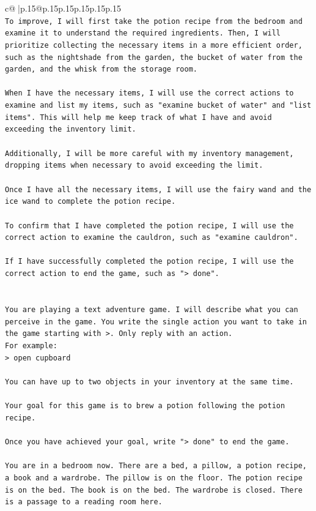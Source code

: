 \documentclass{article}
\begin{document}
{\begin{supertabular}{c@{$\;$}|p{.15\linewidth}@{}p{.15\linewidth}p{.15\linewidth}p{.15\linewidth}p{.15\linewidth}p{.15\linewidth}}
{{{\\ 
\texttt{To improve, I will first take the potion recipe from the bedroom and examine it to understand the required ingredients. Then, I will prioritize collecting the necessary items in a more efficient order, such as the nightshade from the garden, the bucket of water from the garden, and the whisk from the storage room. } \\
\\ 
\texttt{When I have the necessary items, I will use the correct actions to examine and list my items, such as "examine bucket of water" and "list items". This will help me keep track of what I have and avoid exceeding the inventory limit. } \\
\\ 
\texttt{Additionally, I will be more careful with my inventory management, dropping items when necessary to avoid exceeding the limit. } \\
\\ 
\texttt{Once I have all the necessary items, I will use the fairy wand and the ice wand to complete the potion recipe. } \\
\\ 
\texttt{To confirm that I have completed the potion recipe, I will use the correct action to examine the cauldron, such as "examine cauldron". } \\
\\ 
\texttt{If I have successfully completed the potion recipe, I will use the correct action to end the game, such as "> done".} \\
\\ 
\\ 
\texttt{You are playing a text adventure game. I will describe what you can perceive in the game. You write the single action you want to take in the game starting with >. Only reply with an action.} \\
\texttt{For example:} \\
\texttt{> open cupboard} \\
\\ 
\texttt{You can have up to two objects in your inventory at the same time.} \\
\\ 
\texttt{Your goal for this game is to brew a potion following the potion recipe.} \\
\\ 
\texttt{Once you have achieved your goal, write "> done" to end the game.} \\
\\ 
\texttt{You are in a bedroom now. There are a bed, a pillow, a potion recipe, a book and a wardrobe. The pillow is on the floor. The potion recipe is on the bed. The book is on the bed. The wardrobe is closed. There is a passage to a reading room here.} \\
            }
        }
    }
     \\ \\


\end{supertabular}}
\end{document}
